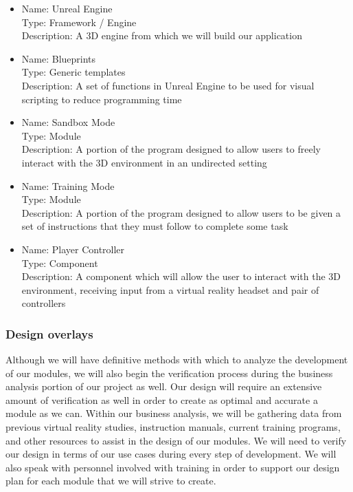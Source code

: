 \documentclass[onecolumn, draftclsnofoot,10pt, compsoc]{IEEEtran}
\begin{document}
\begin{itemize}
    \item Name: Unreal Engine\\
          Type: Framework / Engine\\
          Description: A 3D engine from which we will build our application 
    \item Name: Blueprints\\
          Type: Generic templates\\
          Description: A set of functions in Unreal Engine to be used for visual scripting to reduce programming time
    \item Name: Sandbox Mode\\
          Type: Module\\
          Description: A portion of the program designed to allow users to freely interact with the 3D environment in an undirected setting 
    \item Name: Training Mode\\
          Type: Module\\
          Description: A portion of the program designed to allow users to be given a set of instructions that they must follow to complete some task
    \item Name: Player Controller\\
          Type: Component\\
          Description: A component which will allow the user to interact with the 3D environment, receiving input from a virtual reality headset and pair of controllers
\end{itemize}

\subsubsection{Design overlays}
Although we will have definitive methods with which to analyze the development of our modules, we will also begin the verification process during the business analysis portion of our project as well. Our design will require an extensive amount of verification as well in order to create as optimal and accurate a module as we can. Within our business analysis, we will be gathering data from previous virtual reality studies, instruction manuals, current training programs, and other resources to assist in the design of our modules. We will need to verify our design in terms of our use cases during every step of development. We will also speak with personnel involved with training in order to support our design plan for each module that we will strive to create. 
\end{document}
